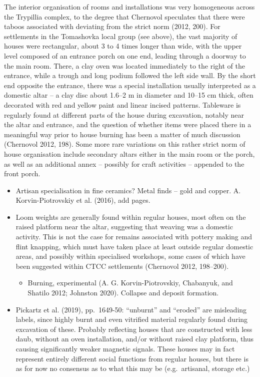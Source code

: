 \documentclass[
  12pt,
  a4paper, twoside]{book}
\providecommand{\tightlist}{%
  \setlength{\itemsep}{0pt}\setlength{\parskip}{0pt}}
\begin{document}
The interior organisation of rooms and installations was very homogeneous across the Trypillia complex, to the degree that Chernovol speculates that there were taboos associated with deviating from the strict norm (2012, 200). For settlements in the Tomashovka local group (see above), the vast majority of houses were rectangular, about 3 to 4 times longer than wide, with the upper level composed of an entrance porch on one end, leading through a doorway to the main room. There, a clay oven was located immediately to the right of the entrance, while a trough and long podium followed the left side wall. By the short end opposite the entrance, there was a special installation usually interpreted as a domestic altar -- a clay disc about 1.6--2 m in diameter and 10--15 cm thick, often decorated with red and yellow paint and linear incised patterns. Tableware is regularly found at different parts of the house during excavation, notably near the altar and entrance, and the question of whether items were placed there in a meaningful way prior to house burning has been a matter of much discussion (Chernovol 2012, 198). Some more rare variations on this rather strict norm of house organisation include secondary altars either in the main room or the porch, as well as an additional annex -- possibly for craft activities -- appended to the front porch.

\begin{itemize}
\item
  Artisan specialisation in fine ceramics? Metal finds -- gold and copper. A. Korvin-Piotrovskiy et al. (2016), add pages.
\item
  Loom weights are generally found within regular houses, most often on the raised platform near the altar, suggesting that weaving was a domestic activity. This is not the case for remains associated with pottery making and flint knapping, which must have taken place at least outside regular domestic areas, and possibly within specialised workshops, some cases of which have been suggested within CTCC settlements (Chernovol 2012, 198--200).

  \begin{itemize}
  \tightlist
  \item
    Burning, experimental (A. G. Korvin-Piotrovskiy, Chabanyuk, and Shatilo 2012; Johnston 2020). Collapse and deposit formation.
  \end{itemize}
\item
  Pickartz et al. (2019), pp.~1649-50: ``unburnt'' and ``eroded'' are misleading labels, since highly burnt and even vitrified material regularly found during excavation of these. Probably reflecting houses that are constructed with less daub, without an oven installation, and/or without raised clay platform, thus causing significantly weaker magnetic signals. These houses may in fact represent entirely different social functions from regular houses, but there is as for now no consensus as to what this may be (e.g.~artisanal, storage etc.)
\end{itemize}
\end{document}
